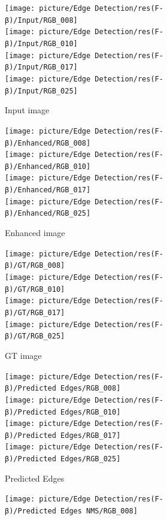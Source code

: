 \documentclass[a4paper]{ctexart}
\begin{document}
		\begin{figure}[htbp]
			\centering
			\begin{subfigure}{0.16\textwidth}
				\texttt{[image: picture/Edge Detection/res(F-β)/Input/RGB\_008]} \\
				\texttt{[image: picture/Edge Detection/res(F-β)/Input/RGB\_010]} \\
				\texttt{[image: picture/Edge Detection/res(F-β)/Input/RGB\_017]} \\
				\texttt{[image: picture/Edge Detection/res(F-β)/Input/RGB\_025]}
				\caption{Input image}
				\label{fig: Input}
			\end{subfigure}
			\begin{subfigure}{0.16\textwidth}
				\texttt{[image: picture/Edge Detection/res(F-β)/Enhanced/RGB\_008]} \\
				\texttt{[image: picture/Edge Detection/res(F-β)/Enhanced/RGB\_010]} \\
				\texttt{[image: picture/Edge Detection/res(F-β)/Enhanced/RGB\_017]} \\
				\texttt{[image: picture/Edge Detection/res(F-β)/Enhanced/RGB\_025]}
				\caption{Enhanced image}
				\label{fig: Enhanced}
			\end{subfigure}
			\begin{subfigure}{0.16\textwidth}
				\texttt{[image: picture/Edge Detection/res(F-β)/GT/RGB\_008]} \\
				\texttt{[image: picture/Edge Detection/res(F-β)/GT/RGB\_010]} \\
				\texttt{[image: picture/Edge Detection/res(F-β)/GT/RGB\_017]} \\
				\texttt{[image: picture/Edge Detection/res(F-β)/GT/RGB\_025]}
				\caption{GT image}
				\label{fig: GT image}
			\end{subfigure}
			\begin{subfigure}{0.16\textwidth}
				\texttt{[image: picture/Edge Detection/res(F-β)/Predicted Edges/RGB\_008]} \\
				\texttt{[image: picture/Edge Detection/res(F-β)/Predicted Edges/RGB\_010]} \\
				\texttt{[image: picture/Edge Detection/res(F-β)/Predicted Edges/RGB\_017]} \\
				\texttt{[image: picture/Edge Detection/res(F-β)/Predicted Edges/RGB\_025]}
				\caption{Predicted Edges}
				\label{fig: Predicted Edges}
			\end{subfigure}
			\begin{subfigure}{0.16\textwidth}
				\texttt{[image: picture/Edge Detection/res(F-β)/Predicted Edges NMS/RGB\_008]} \\

\end{subfigure}
\end{figure}
\end{document}
